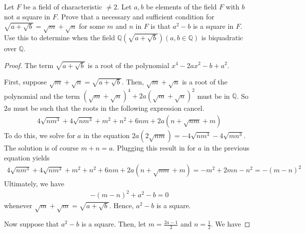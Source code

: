 \documentclass[10pt]{article}
\newcommand{\Q}{\mathbb{Q}}
\newenvironment{problem}[2][Problem]{\begin{trivlist}
		\item[\hskip \labelsep {\bfseries #1}\hskip \labelsep {\bfseries #2.}]}{\end{trivlist}}
\begin{document}
	\begin{problem}{2.9}
		Let $F$ be a field of characteristic $\not = 2$. Let $a,b$ be elements of the field $F$ with $b$ not $a$ square in $F$. Prove that a necessary and sufficient condition for $\sqrt{a + \sqrt{b}} = \sqrt{m} + \sqrt{n}$	for some $m$ and $n$ in $F$ is that $a^2 - b$ is a square in $F$. Use this to determine when the field $\Q(\sqrt{a + \sqrt{b}}) (a, b \in \Q)$ is biquadratic over $\Q$.
		\begin{proof}
			The term $\sqrt{a+\sqrt{b}}$ is a root of the polynomial $x^4 - 2ax^2 - b + a^2$. 
			
			First, suppose $\sqrt{m} + \sqrt{n} = \sqrt{a+\sqrt{b}}$. Then, $\sqrt{m} + \sqrt{n}$ is a root of the polynomial and the term $(\sqrt{m} + \sqrt{n})^4 + 2a(\sqrt{m} + \sqrt{n})^2$ must be in $\Q$. So $2a$ must be such that the roots in the following expression cancel.
			\begin{align*}
				4\sqrt{nm^3} + 4\sqrt{nm^3} + m^2 + n^2 + 6nm + 2a(n + \sqrt{nm} + m)
			\end{align*}
			To do this, we solve for $a$ in the equation $2a(2\sqrt{nm}) = -4\sqrt{nm^3} - 4\sqrt{mn^3}$. The solution is of course $m+n = a$. Plugging this result in for $a$ in the previous equation yields
			\begin{align*}
				4\sqrt{nm^3} + 4\sqrt{nm^3} + m^2 + n^2 + 6nm + 2a(n + \sqrt{nm} + m) = -m^2 +2mn - n^2 = -(m-n)^2
			\end{align*}
			Ultimately, we have
			\begin{align*}
				-(m-n)^2 + a^2 -b = 0
			\end{align*}
			whenever $\sqrt{m} + \sqrt{m} = \sqrt{a + \sqrt{b}}$. Hence, $a^2 -b$ is a square.
			
			Now suppose that $a^2-b$ is a square. Then, let $m = \frac{2a-1}{2}$ and $n=\frac{1}{2}$. We have 
		\end{proof}
	\end{problem}
	
\end{document}
